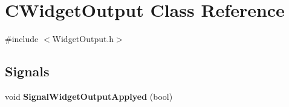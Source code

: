 \hypertarget{classCWidgetOutput}{
\section{CWidgetOutput Class Reference}
\label{classCWidgetOutput}
}


{\ttfamily \#include $<$WidgetOutput.h$>$}\subsection*{Signals}
\begin{DoxyCompactItemize}
\item 
\hypertarget{classCWidgetOutput_a11366e1de30efb1e0a670104eeaac601}{
void {\bfseries SignalWidgetOutputApplyed} (bool)}
\label{classCWidgetOutput_a11366e1de30efb1e0a670104eeaac601}

\end{DoxyCompactItemize}
